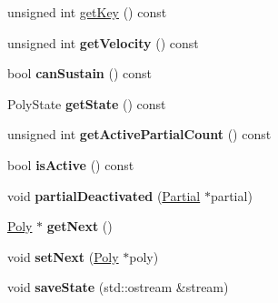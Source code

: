 \begin{DoxyCompactItemize}
\item 
unsigned int \hyperlink{classMT32Emu_1_1Poly_a6a79e77e725588976ee0b991011fb48a}{get\-Key} () const 
\item 
\hypertarget{classMT32Emu_1_1Poly_a2e3e5d52155b05a1f3f952b836da4dde}{unsigned int {\bfseries get\-Velocity} () const }\label{classMT32Emu_1_1Poly_a2e3e5d52155b05a1f3f952b836da4dde}

\item 
\hypertarget{classMT32Emu_1_1Poly_a75e3fad372218b249adba9a7ace0b21f}{bool {\bfseries can\-Sustain} () const }\label{classMT32Emu_1_1Poly_a75e3fad372218b249adba9a7ace0b21f}

\item 
\hypertarget{classMT32Emu_1_1Poly_a5c23313334953f2179b34161e2c2803f}{Poly\-State {\bfseries get\-State} () const }\label{classMT32Emu_1_1Poly_a5c23313334953f2179b34161e2c2803f}

\item 
\hypertarget{classMT32Emu_1_1Poly_a88b46902e05e80ec3deb45ae18e96a45}{unsigned int {\bfseries get\-Active\-Partial\-Count} () const }\label{classMT32Emu_1_1Poly_a88b46902e05e80ec3deb45ae18e96a45}

\item 
\hypertarget{classMT32Emu_1_1Poly_a4f3817b3cb69604ef43ce7b7170cbdec}{bool {\bfseries is\-Active} () const }\label{classMT32Emu_1_1Poly_a4f3817b3cb69604ef43ce7b7170cbdec}

\item 
\hypertarget{classMT32Emu_1_1Poly_a7db1ab26e8e34a2dd53e617fb7b711d9}{void {\bfseries partial\-Deactivated} (\hyperlink{classMT32Emu_1_1Partial}{Partial} $\ast$partial)}\label{classMT32Emu_1_1Poly_a7db1ab26e8e34a2dd53e617fb7b711d9}

\item 
\hypertarget{classMT32Emu_1_1Poly_a009d498367758effdf892a48e5f21ba7}{\hyperlink{classMT32Emu_1_1Poly}{Poly} $\ast$ {\bfseries get\-Next} ()}\label{classMT32Emu_1_1Poly_a009d498367758effdf892a48e5f21ba7}

\item 
\hypertarget{classMT32Emu_1_1Poly_a51c5bc70209de01f2d00e7ee3fe72dc3}{void {\bfseries set\-Next} (\hyperlink{classMT32Emu_1_1Poly}{Poly} $\ast$poly)}\label{classMT32Emu_1_1Poly_a51c5bc70209de01f2d00e7ee3fe72dc3}

\item 
\hypertarget{classMT32Emu_1_1Poly_a3b31dec32c6e8a08d5fb291039d671b7}{void {\bfseries save\-State} (std\-::ostream \&stream)}\label{classMT32Emu_1_1Poly_a3b31dec32c6e8a08d5fb291039d671b7}


\end{DoxyCompactItemize}
